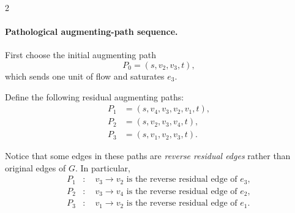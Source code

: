 \documentclass[10pt]{article}
\theoremstyle{definition}
\begin{document}
\begin{multicols*}{2}
\begin{figure}[H]
\end{figure}

\paragraph{Pathological augmenting-path sequence.}

First choose the initial augmenting path
\[
P_0=(s,v_2,v_3,t),
\]
which sends one unit of flow and saturates $e_3$.

Define the following residual augmenting paths:
\begin{align*}
P_1 &= (s,v_4,v_3,v_2,v_1,t),\\
P_2 &= (s,v_2,v_3,v_4,t),\\
P_3 &= (s,v_1,v_2,v_3,t).
\end{align*}

Notice that some edges in these paths are
\emph{reverse residual edges} rather than original edges of $G$.
In particular,
\begin{align*}
P_1 &: \quad v_3 \to v_2
      \text{ is the reverse residual edge of }e_3,\\
P_2 &: \quad v_3 \to v_4
      \text{ is the reverse residual edge of }e_2,\\
P_3 &: \quad v_1 \to v_2
      \text{ is the reverse residual edge of }e_1.
\end{align*}


\end{multicols*}
\end{document}
